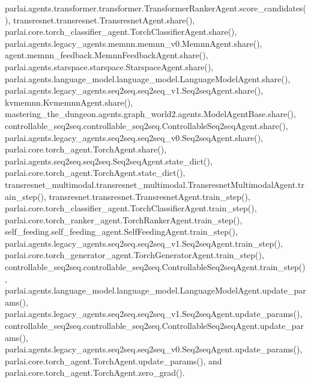 parlai.\+agents.\+transformer.\+transformer.\+Transformer\+Ranker\+Agent.\+score\+\_\+candidates(), transresnet.\+transresnet.\+Transresnet\+Agent.\+share(), parlai.\+core.\+torch\+\_\+classifier\+\_\+agent.\+Torch\+Classifier\+Agent.\+share(), parlai.\+agents.\+legacy\+\_\+agents.\+memnn.\+memnn\+\_\+v0.\+Memnn\+Agent.\+share(), agent.\+memnn\+\_\+feedback.\+Memnn\+Feedback\+Agent.\+share(), parlai.\+agents.\+starspace.\+starspace.\+Starspace\+Agent.\+share(), parlai.\+agents.\+language\+\_\+model.\+language\+\_\+model.\+Language\+Model\+Agent.\+share(), parlai.\+agents.\+legacy\+\_\+agents.\+seq2seq.\+seq2seq\+\_\+v1.\+Seq2seq\+Agent.\+share(), kvmemnn.\+Kvmemnn\+Agent.\+share(), mastering\+\_\+the\+\_\+dungeon.\+agents.\+graph\+\_\+world2.\+agents.\+Model\+Agent\+Base.\+share(), controllable\+\_\+seq2seq.\+controllable\+\_\+seq2seq.\+Controllable\+Seq2seq\+Agent.\+share(), parlai.\+agents.\+legacy\+\_\+agents.\+seq2seq.\+seq2seq\+\_\+v0.\+Seq2seq\+Agent.\+share(), parlai.\+core.\+torch\+\_\+agent.\+Torch\+Agent.\+share(), parlai.\+agents.\+seq2seq.\+seq2seq.\+Seq2seq\+Agent.\+state\+\_\+dict(), parlai.\+core.\+torch\+\_\+agent.\+Torch\+Agent.\+state\+\_\+dict(), transresnet\+\_\+multimodal.\+transresnet\+\_\+multimodal.\+Transresnet\+Multimodal\+Agent.\+train\+\_\+step(), transresnet.\+transresnet.\+Transresnet\+Agent.\+train\+\_\+step(), parlai.\+core.\+torch\+\_\+classifier\+\_\+agent.\+Torch\+Classifier\+Agent.\+train\+\_\+step(), parlai.\+core.\+torch\+\_\+ranker\+\_\+agent.\+Torch\+Ranker\+Agent.\+train\+\_\+step(), self\+\_\+feeding.\+self\+\_\+feeding\+\_\+agent.\+Self\+Feeding\+Agent.\+train\+\_\+step(), parlai.\+agents.\+legacy\+\_\+agents.\+seq2seq.\+seq2seq\+\_\+v1.\+Seq2seq\+Agent.\+train\+\_\+step(), parlai.\+core.\+torch\+\_\+generator\+\_\+agent.\+Torch\+Generator\+Agent.\+train\+\_\+step(), controllable\+\_\+seq2seq.\+controllable\+\_\+seq2seq.\+Controllable\+Seq2seq\+Agent.\+train\+\_\+step(), parlai.\+agents.\+language\+\_\+model.\+language\+\_\+model.\+Language\+Model\+Agent.\+update\+\_\+params(), parlai.\+agents.\+legacy\+\_\+agents.\+seq2seq.\+seq2seq\+\_\+v1.\+Seq2seq\+Agent.\+update\+\_\+params(), controllable\+\_\+seq2seq.\+controllable\+\_\+seq2seq.\+Controllable\+Seq2seq\+Agent.\+update\+\_\+params(), parlai.\+agents.\+legacy\+\_\+agents.\+seq2seq.\+seq2seq\+\_\+v0.\+Seq2seq\+Agent.\+update\+\_\+params(), parlai.\+core.\+torch\+\_\+agent.\+Torch\+Agent.\+update\+\_\+params(), and parlai.\+core.\+torch\+\_\+agent.\+Torch\+Agent.\+zero\+\_\+grad().

\mbox{\label{classparlai_1_1agents_1_1language__model_1_1language__model_1_1LanguageModelAgent_ab9e45cf73e4e7d933c92826a3a0c2d68}} 
